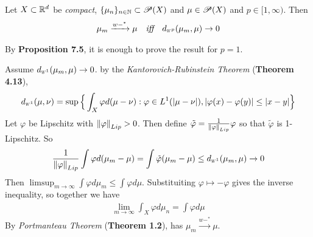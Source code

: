 \documentclass[12pt,a4paper]{article}
\newenvironment{proof}
{\begin{changemargin}{1cm}{0.5cm} 
	}%
	{\end{changemargin}
}
\newenvironment{p}
{\begin{proof} 
	}%
	{\end{proof}
}
\begin{document}
 Let $X\subset \mathbb{R}^d$ be \emph{compact}, $\{\mu_n\}_{n\in \mathbb{N}} \subset \mathscr{P}(X)$ and $\mu\in \mathscr{P}(X)$ and $p\in [1, \infty)$. Then
\begin{align*}
\mu_m \xrightarrow{w-^*} \mu \quad \emph{iff} \quad \wa{p}(\mu_m, \mu) \rightarrow 0
\end{align*}
\begin{p}
\pf By \textbf{Proposition 7.5}, it is enough to prove the result for $p=1$.

\quad Assume $\wa{1}(\mu_m, \mu)\rightarrow 0$. by the \emph{Kantorovich-Rubinstein Theorem} (\textbf{Theorem 4.13}),
\begin{align*}
\wa{1}(\mu, \nu) = \sup \Big\{ \int_X \varphi d(\mu -\nu) : \varphi\in L^1(|\mu-\nu|),  |\varphi(x) - \varphi(y)| \leq |x-y| \Big\}
\end{align*}
Let $\varphi$ be Lipschitz with $\snorms{\varphi}{Lip} >0$. Then define $\tilde{\varphi} = \frac{1}{\snorms{\varphi}{Lip}}\varphi$ so that $\tilde{\varphi}$ is 1-Lipschitz. So
\begin{align*}
\frac{1}{\snorms{\varphi}{Lip}} \int \varphi d(\mu_m -\mu) = \int \tilde{\varphi}(\mu_m - \mu) \leq \wa{1}(\mu_m, \mu) \rightarrow 0
\end{align*}
Then $\limsup_{m\rightarrow \infty} \int\varphi d\mu_m \leq \int\varphi d\mu$. Substituiting $\varphi \mapsto -\varphi$ gives the inverse inequality, so together we have
\begin{align*}
\lim_{m\rightarrow \infty} \int_X \varphi d\mu_n = \int \varphi d\mu
\end{align*}
By \emph{Portmanteau Theorem} (\textbf{Theorem 1.2}), has $\mu_m \xrightarrow{w-^*} \mu$.
\s


\end{p}
\end{document}
